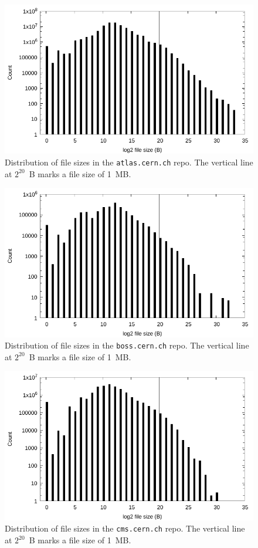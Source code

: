 \documentclass[sigconf]{acmart}
\begin{document}
\begin{figure}
\includegraphics[width=\linewidth]{plots/file-hist/atlas.pdf}
\caption{Distribution of file sizes in the \texttt{atlas.cern.ch} repo.
The vertical line at $2^{20}$~B marks a file size of 1~MB.}
\end{figure}

\begin{figure}
\includegraphics[width=\linewidth]{plots/file-hist/boss.pdf}
\caption{Distribution of file sizes in the \texttt{boss.cern.ch} repo.
The vertical line at $2^{20}$~B marks a file size of 1~MB.}
\end{figure}

\begin{figure}
\includegraphics[width=\linewidth]{plots/file-hist/cms.pdf}
\caption{Distribution of file sizes in the \texttt{cms.cern.ch} repo.
The vertical line at $2^{20}$~B marks a file size of 1~MB.}
\end{figure}
\end{document}
